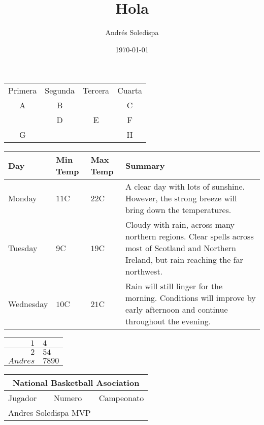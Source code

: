 \documentclass[a4paper,12pt]{article}
\author{Andrés Soledispa}
\title{Hola}
\date{\today}
\begin{document}
\maketitle
\begin{tabular}{|c|c|c|c|}
\hline Primera & Segunda & Tercera & Cuarta \\ \cline{1-3}
A & B & & C \\ \hline
& D & E & F \\ \hline
G & & & H \\ \hline
\end{tabular}
 \begin{center}
 \begin{tabular}{ | l | l | l | p{5cm} |}
 \hline
 Day & Min Temp & Max Temp & Summary \\ \hline

 Monday & \(11\)C & \(22\)C & A clear day with lots of sunshine.
 However, the strong breeze will bring down the temperatures. \\ \hline
 Tuesday & \(9\)C & \(19\)C & Cloudy with rain, across many northern regions. Clear spells
 across most of Scotland and Northern Ireland,
 but rain reaching the far northwest. \\ \hline
 Wednesday & \(10\)C & \(21\)C & Rain will still linger for the morning.
 Conditions will improve by early afternoon and continue
 throughout the evening. \\
 \hline
 \end{tabular}
 \end{center}
\begin{center}
\begin{tabular}{|r @{-} l|} %
\hline
\(1\) & \(4\) \\ \hline
\(2\) & \(54\) \\ \hline
\(Andres\) & \(7890\) \\ \hline
\end{tabular}
\end{center}

\begin{tabular}{|l|l|c|} \hline
\multicolumn{3}{|c|}{National Basketball Asociation}\\ \hline \hline \textsf{Jugador} & \textsf{Numero} & \textsf{Campeonato}\\ \hline
\multicolumn{2}{l}{\small *Andres Soledispa MVP}
\end{tabular}
\end{document}
